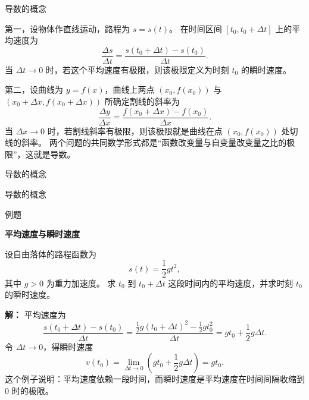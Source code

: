 \documentclass[aspectratio=169,10pt,fontset=fandol]{ctexbeamer}
\begin{document}
\begin{frame}[t,fragile]{导数的概念}
\small
{\small
第一，设物体作直线运动，路程为 $s=s(t)$。 在时间区间 $[t_0,t_0+\Delta t]$ 上的平均速度为
\[
\frac{\Delta s}{\Delta t}
=\frac{s(t_0+\Delta t)-s(t_0)}{\Delta t}.
\]
当 $\Delta t\to0$ 时，若这个平均速度有极限，则该极限定义为时刻 $t_0$ 的瞬时速度。


}
{\small
第二，设曲线为 $y=f(x)$，曲线上两点 $(x_0,f(x_0))$ 与 $(x_0+\Delta x,f(x_0+\Delta x))$ 所确定割线的斜率为
\[
\frac{\Delta y}{\Delta x}
=\frac{f(x_0+\Delta x)-f(x_0)}{\Delta x}.
\]
当 $\Delta x\to0$ 时，若割线斜率有极限，则该极限就是曲线在点 $(x_0,f(x_0))$ 处切线的斜率。 两个问题的共同数学形式都是“函数改变量与自变量改变量之比的极限”，这就是导数。


}
\end{frame}
\begin{frame}[t,fragile]{导数的概念}
\normalsize
{\normalsize
\begin{center}
\end{center}
}
\end{frame}
\begin{frame}[t,fragile]{导数的概念}
\small
\begin{block}{例题}
{\small
\textbf{平均速度与瞬时速度}\par

设自由落体的路程函数为
\[
s(t)=\frac12gt^2,
\]
其中 $g>0$ 为重力加速度。 求 $t_0$ 到 $t_0+\Delta t$ 这段时间内的平均速度，并求时刻 $t_0$ 的瞬时速度。

}
\end{block}
\pause
{\small
\textbf{解：}
平均速度为
\[
\frac{s(t_0+\Delta t)-s(t_0)}{\Delta t}
=\frac{\frac12g(t_0+\Delta t)^2-\frac12gt_0^2}{\Delta t}
=gt_0+\frac12g\Delta t.
\]
令 $\Delta t\to0$，得瞬时速度
\[
v(t_0)=\lim_{\Delta t\to0}\left(gt_0+\frac12g\Delta t\right)=gt_0.
\]
这个例子说明：平均速度依赖一段时间，而瞬时速度是平均速度在时间间隔收缩到 $0$ 时的极限。

}
\end{frame}
\end{document}
